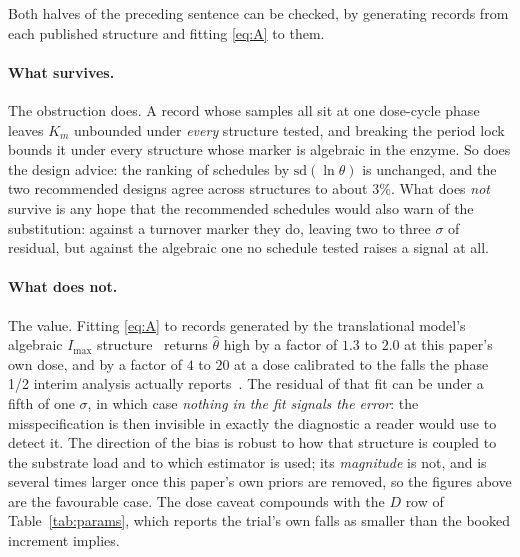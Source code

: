 \begin{remark}
\label{rem:structure_relative}
Both halves of the preceding sentence can be checked, by generating records from each
published structure and fitting \eqref{eq:A} to them.

\paragraph{What survives.} The obstruction does. A record whose samples all sit at one
dose-cycle phase leaves $K_m$ unbounded under \emph{every} structure tested, and breaking
the period lock bounds it under every structure whose marker is algebraic in the enzyme.
So does the design advice: the ranking of schedules by $\mathrm{sd}(\ln\theta)$ is
unchanged, and the two recommended designs agree across structures to about $3\%$. What
does \emph{not} survive is any hope that the recommended schedules would also warn of the
substitution: against a turnover marker they do, leaving two to three $\sigma$ of residual,
but against the algebraic one no schedule tested raises a signal at all.

\paragraph{What does not.} The value. Fitting \eqref{eq:A} to records generated by the
translational model's algebraic $I_{\max}$ structure~\cite{pkpd_translational} returns
$\hat\theta$ high by a factor of $1.3$ to $2.0$ at this paper's own dose, and by a factor
of $4$ to $20$ at a dose calibrated to the falls the phase 1/2 interim analysis actually
reports~\cite{trial_phase12}. The residual of that fit can be under a fifth of one
$\sigma$, in which case \emph{nothing in the fit signals the error}: the misspecification
is then invisible in exactly the diagnostic a reader would use to detect it. The direction
of the bias is robust to how that structure is coupled to the substrate load and to which
estimator is used; its \emph{magnitude} is not, and is several times larger once this
paper's own priors are removed, so the figures above are the favourable case. The dose
caveat compounds with the $D$ row of Table~\ref{tab:params}, which reports the trial's own
falls as smaller than the booked increment implies.


\end{remark}
